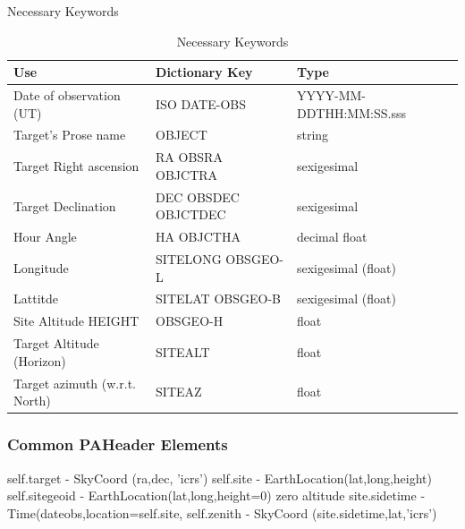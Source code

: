 \documentclass[letter,11pt,oneside]{article}
\begin{document}
\begin{table}[h!]
\caption[Keywords]{Necessary Keywords}
\centering
\begin{tabular}{ l  l l }
\hline
Use  & Dictionary Key & Type  \\
\hline
Date of observation (UT)       & ISO DATE-OBS        &  YYYY-MM-DDTHH:MM:SS.sss   \\ 
Target's Prose name            & OBJECT              &  string  \\ 
Target Right ascension         & RA OBSRA OBJCTRA    &  sexigesimal   \\ 
Target Declination             & DEC OBSDEC OBJCTDEC &  sexigesimal  \\ 
Hour Angle                     & HA OBJCTHA          &  decimal float  \\ 
Longitude                      & SITELONG OBSGEO-L   &  sexigesimal (float)  \\ 
Lattitde                       & SITELAT OBSGEO-B    &  sexigesimal (float)   \\ 
Site Altitude HEIGHT           & OBSGEO-H            &  float  \\ 
Target Altitude (Horizon)      & SITEALT             &  float  \\ 
Target azimuth  (w.r.t. North) & SITEAZ              &  float  \\ 
\hline
\end{tabular}
\caption[Necessary Keywords]{Necessary Keywords}
\label{table:NecessaryKeywords}
\end{table}

\subsubsection{Common PAHeader Elements}

self.target     - SkyCoord (ra,dec, 'icrs')
self.site       - EarthLocation(lat,long,height)
self.sitegeoid  - EarthLocation(lat,long,height=0) zero altitude
site.sidetime   - Time(dateobs,location=self.site,
self.zenith     - SkyCoord (site.sidetime,lat,'icrs')
\end{document}
